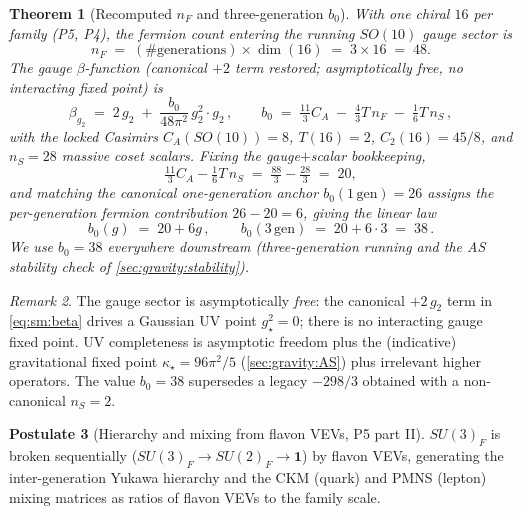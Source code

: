 \documentclass[11pt]{article}
\theoremstyle{plain}
\newtheorem{theorem}{Theorem}[section]
\theoremstyle{definition}
\newtheorem{postulate}[theorem]{Postulate}
\theoremstyle{remark}
\newtheorem{remark}[theorem]{Remark}
\begin{document}
\begin{theorem}[Recomputed $n_F$ and three-generation $b_0$]\label{thm:sm:b0}
With one chiral $16$ per family (P5, P4), the fermion count entering the running
$SO(10)$ gauge sector is
\begin{equation}\label{eq:sm:nF}
n_F \;=\; (\#\text{generations})\times \dim(16) \;=\; 3\times 16 \;=\; 48 .
\end{equation}
The gauge $\beta$-function (canonical $+2$ term restored; asymptotically free, no
interacting fixed point) is
\begin{equation}\label{eq:sm:beta}
\beta_{g_2} \;=\; 2\,g_2 \;+\; \frac{b_0}{48\pi^2}\,g_2^2\cdot g_2\,,
\qquad
b_0 \;=\; \tfrac{11}{3}C_A \;-\; \tfrac{4}{3}T\,n_F \;-\; \tfrac{1}{6}T\,n_S\,,
\end{equation}
with the locked Casimirs $C_A(SO(10))=8$, $T(16)=2$, $C_2(16)=45/8$, and
$n_S=28$ massive coset scalars. Fixing the gauge$+$scalar bookkeeping,
\begin{equation}\label{eq:sm:b0anchor}
\tfrac{11}{3}C_A - \tfrac{1}{6}T\,n_S
 \;=\; \tfrac{88}{3}-\tfrac{28}{3} \;=\; 20 ,
\end{equation}
and matching the canonical one-generation anchor $b_0(1\,\mathrm{gen})=26$ assigns the
per-generation fermion contribution $26-20=6$, giving the linear law
\begin{equation}\label{eq:sm:b0law}
b_0(g)\;=\;20+6g\,,
\qquad
\boxed{\,b_0(3\,\mathrm{gen}) \;=\; 20+6\cdot 3 \;=\; 38\,.}
\end{equation}
We use $b_0=38$ everywhere downstream (three-generation running and the AS stability
check of \autoref{sec:gravity:stability}).
\end{theorem}

\begin{remark}
The gauge sector is asymptotically \emph{free}: the canonical $+2\,g_2$ term in
\eqref{eq:sm:beta} drives a Gaussian UV point $g^2_\star=0$; there is no interacting
gauge fixed point. UV completeness is asymptotic freedom plus the (indicative)
gravitational fixed point $\kappa_\star=96\pi^2/5$ (\autoref{sec:gravity:AS}) plus
irrelevant higher operators. The value $b_0=38$ supersedes a legacy $-298/3$
obtained with a non-canonical $n_S=2$.
\end{remark}

\begin{postulate}[Hierarchy and mixing from flavon VEVs, P5 part II]\label{post:sm:flavons}
$SU(3)_F$ is broken sequentially ($SU(3)_F\to SU(2)_F\to \mathbf{1}$) by flavon VEVs,
generating the inter-generation Yukawa hierarchy and the CKM (quark) and PMNS (lepton)
mixing matrices as ratios of flavon VEVs to the family scale.
\end{postulate}
\end{document}
